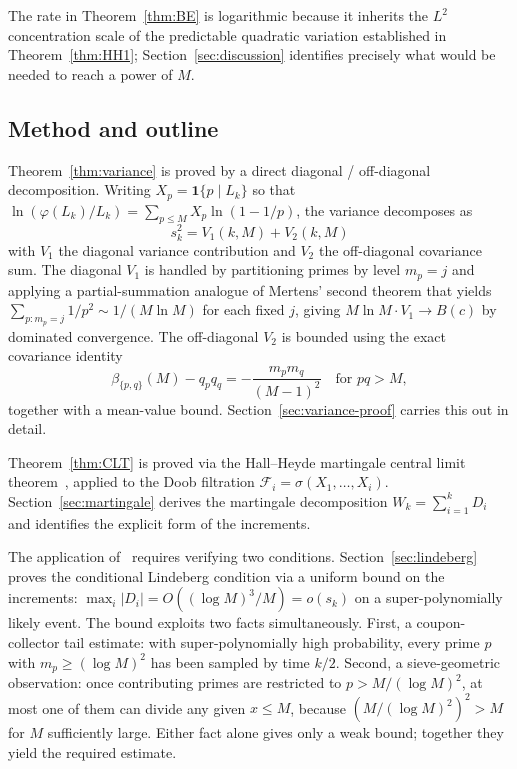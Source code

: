 \documentclass[11pt]{article}
\theoremstyle{remark}
\newcommand{\F}{\mathcal{F}}
\newcommand{\one}{\mathbf{1}}
\begin{document}
The rate in Theorem~\ref{thm:BE} is logarithmic because it inherits the $L^2$ concentration scale of the predictable quadratic variation established in Theorem~\ref{thm:HH1}; Section~\ref{sec:discussion} identifies precisely what would be needed to reach a power of $M$.

\subsection{Method and outline}

Theorem~\ref{thm:variance} is proved by a direct diagonal / off-diagonal decomposition. Writing $X_p = \one\{p \mid L_k\}$ so that $\ln(\varphi(L_k)/L_k) = \sum_{p \leq M} X_p \ln(1 - 1/p)$, the variance decomposes as
\[
s_k^2 = V_1(k, M) + V_2(k, M)
\]
with $V_1$ the diagonal variance contribution and $V_2$ the off-diagonal covariance sum. The diagonal $V_1$ is handled by partitioning primes by level $m_p = j$ and applying a partial-summation analogue of Mertens' second theorem that yields $\sum_{p \colon m_p = j} 1/p^2 \sim 1/(M \ln M)$ for each fixed $j$, giving $M \ln M \cdot V_1 \to B(c)$ by dominated convergence. The off-diagonal $V_2$ is bounded using the exact covariance identity
\[
\beta_{\{p,q\}}(M) - q_p q_q = -\frac{m_p m_q}{(M-1)^2} \quad \text{for } pq > M,
\]
together with a mean-value bound. Section~\ref{sec:variance-proof} carries this out in detail.

Theorem~\ref{thm:CLT} is proved via the Hall--Heyde martingale central limit theorem~\cite[Thm.~3.2]{HH}, applied to the Doob filtration $\F_i = \sigma(X_1, \ldots, X_i)$. Section~\ref{sec:martingale} derives the martingale decomposition $W_k = \sum_{i=1}^k D_i$ and identifies the explicit form of the increments.

The application of~\cite{HH} requires verifying two conditions. Section~\ref{sec:lindeberg} proves the conditional Lindeberg condition via a uniform bound on the increments: $\max_i |D_i| = O((\log M)^3/M) = o(s_k)$ on a super-polynomially likely event. The bound exploits two facts simultaneously. First, a coupon-collector tail estimate: with super-polynomially high probability, every prime $p$ with $m_p \geq (\log M)^2$ has been sampled by time $k/2$. Second, a sieve-geometric observation: once contributing primes are restricted to $p > M/(\log M)^2$, at most one of them can divide any given $x \leq M$, because $(M/(\log M)^2)^2 > M$ for $M$ sufficiently large. Either fact alone gives only a weak bound; together they yield the required estimate.
\end{document}
